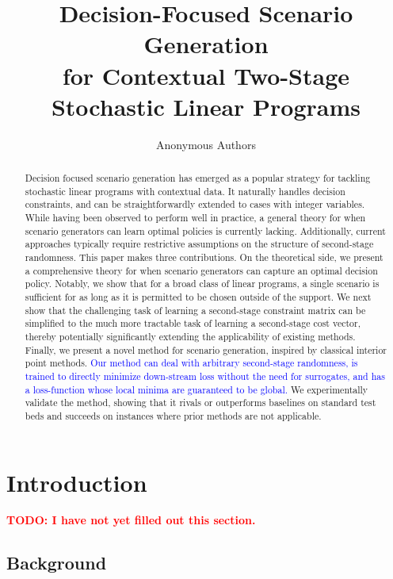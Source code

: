 \documentclass{article}
\title{Decision-Focused Scenario\\
Generation\\
for Contextual Two-Stage Stochastic Linear Programs}
\author{Anonymous Authors}
\theoremstyle{plain}
\theoremstyle{definition}
\theoremstyle{remark}
\begin{document}
\maketitle

\begin{abstract}
Decision focused scenario generation has emerged as a popular strategy for tackling stochastic linear programs with contextual data. It naturally handles decision constraints, and can be straightforwardly extended to cases with integer variables. While having been observed to perform well in practice, a general theory for when scenario generators can learn optimal policies is currently lacking. Additionally, current approaches typically require restrictive assumptions on the structure of second-stage randomness.
This paper makes three contributions. On the theoretical side, we present a comprehensive theory for when scenario generators can capture an optimal decision policy. Notably, we show that for a broad class of linear programs, a single scenario is sufficient for as long as it is permitted to be chosen outside of the support.
We next show that the challenging task of learning a second-stage constraint matrix can be simplified to the much more tractable task of learning a second-stage cost vector, thereby potentially significantly extending the applicability of existing methods.
Finally, we present a novel method for scenario generation, inspired by classical interior point methods.
\textcolor{blue}{Our method can deal with arbitrary second-stage randomness, is trained to directly minimize down-stream loss without the need for surrogates, and has a loss-function whose local minima are guaranteed to be global.}
We experimentally validate the method, showing that it rivals or outperforms baselines on standard test beds and succeeds on instances where prior methods are not applicable.
\end{abstract}

\section{Introduction}
\label{sec:introduction}
\textcolor{red}{\textbf{TODO: I have not yet filled out this section.}}

\subsection{Background}
\label{sec:background}
%
\end{document}
